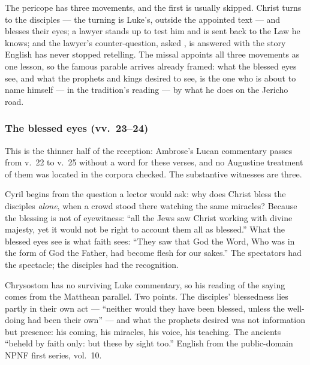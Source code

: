 
The pericope has three movements, and the first is usually skipped. Christ
turns to the disciples --- the turning is Luke's, outside the appointed text
--- and blesses their eyes; a lawyer stands up to test him and is sent back to
the Law he knows; and the lawyer's counter-question, asked , is answered with the story English has never stopped
retelling. The missal appoints all three movements as one lesson, so the
famous parable arrives already framed: what the blessed eyes see, and what the
prophets and kings desired to see, is the one who is about to name himself ---
in the tradition's reading --- by what he does on the Jericho road.

\subsubsection*{The blessed eyes (vv.~23--24)}

This is the thinner half of the reception: Ambrose's Lucan
commentary passes from v.~22 to v.~25 without a word for these verses, and no
Augustine treatment of them was located in the corpora checked. The
substantive witnesses are three.

\begin{witnessnote}
Cyril begins from the question a lector would ask: why does Christ bless the
disciples \textit{alone}, when a crowd stood there watching the same miracles?
Because the blessing is not of eyewitness: ``all the Jews saw Christ working
with divine majesty, yet it would not be right to account them all as
blessed.'' What the blessed eyes see is what faith sees: ``They saw that God
the Word, Who was in the form of God the Father, had become flesh for our
sakes.'' The spectators had the spectacle; the disciples had the recognition.
\end{witnessnote}

\begin{witnessnote}
Chrysostom has no surviving Luke commentary, so his reading of the saying
comes from the Matthean parallel. Two points. The disciples' blessedness lies partly in
their own act --- ``neither would they have been blessed, unless the
well-doing had been their own'' --- and what the prophets desired was not
information but presence: his coming, his miracles, his voice, his teaching.
The ancients ``beheld by faith only: but these by sight too.'' English from
the public-domain NPNF first series, vol.~10.
\end{witnessnote}

